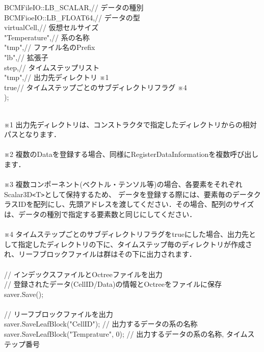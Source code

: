 \documentclass[twoside]{jbook}
\begin{document}
\begin{tabbing}
\>BCMFileIO::LB\_SCALAR,\>// データの種別 \\
\>BCMFioeIO::LB\_FLOAT64,\>// データの型 \\
\>virtualCell,\>// 仮想セルサイズ \\
\>"Temperature",\>// 系の名称 \\
\>"tmp",\>// ファイル名のPrefix \\
\>"lb",\>// 拡張子 \\
\>step,\>// タイムステップリスト \\
\>"tmp",\>// 出力先ディレクトリ ※1 \\
\>true\>// タイムステップごとのサブディレクトリフラグ ※4 \\
); \\
 \\
\end{tabbing}
※1 出力先ディレクトリは、コンストラクタで指定したディレクトリからの相対パスとなります． \\
 \\
※2 複数のDataを登録する場合、同様にRegisterDataInformationを複数呼び出します． \\
 \\
※3 複数コンポーネント(ベクトル・テンソル等)の場合、各要素をそれぞれScalar3D\verb|<|T\verb|>|として保持するため、 データを登録する際には、要素毎のデータクラスIDを配列にし、先頭アドレスを渡してください．その場合、配列のサイズは、データの種別で指定する要素数と同じにしてください． \\
 \\
※4 タイムステップごとのサブディレクトリフラグをtrueにした場合、出力先として指定したディレクトリの下に、タイムステップ毎のディレクトリが作成され、リーフブロックファイルは群はその下に出力されます． \\
 \\
// インデックスファイルとOctreeファイルを出力 \\
// 登録されたデータ(CellID/Data)の情報とOctreeをファイルに保存 \\
saver.Save(); \\
              \\
// リーフブロックファイルを出力 \\
saver.SaveLeafBlock("CellID");        // 出力するデータの系の名称 \\
saver.SaveLeafBlock("Temprature", 0); // 出力するデータの系の名称, タイムステップ番号 \\
\\
\\
\end{document}
